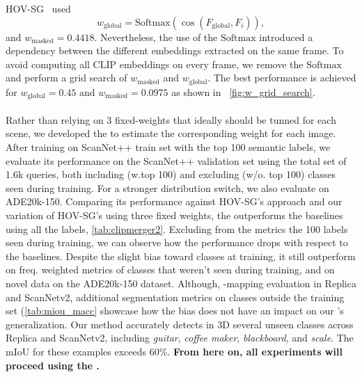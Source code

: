 HOV-SG~\cite{hovsg} used
\begin{equation}
  w_\text{global}= \mathrm{Softmax}(\cos(F_\text{global},F_{i})),
\end{equation}
%
and $w_\text{masked} = 0.4418$. 
Nevertheless, the use of the $\mathrm{Softmax}$ introduced a dependency between the different embeddings extracted on the same frame. To avoid computing all CLIP embeddings on every frame, we remove the $\mathrm{Softmax}$ and perform a grid search of \(w_\text{masked}\) and \(w_\text{global}\).
The best performance is achieved for \(w_\text{global} = 0.45 \text{ and } w_\text{masked} = 0.0975\) as shown in ~\cref{fig:w_grid_search}.
\paragraph{\clipours}
Rather than relying on 3 fixed-weights that ideally should be tunned for each scene, we developed the \clipours to estimate the corresponding weight for each image.
After training on ScanNet++ train set with the top 100 semantic labels, we evaluate its performance on the ScanNet++ validation set using the total set of 1.6k queries, both including (w.top 100) and excluding (w/o. top 100) classes seen during training. For a stronger distribution switch, we also evaluate on ADE20k-150.
\newline
Comparing its performance against HOV-SG's approach and our variation of HOV-SG's using three fixed weights, the \clipours outperforms the baselines using all the labels, \cref{tab:clipmerger2}. 
Excluding from the metrics the 100 labels seen during training, we can observe how the \clipours performance drops with respect to the baselines.
Despite the slight bias toward classes at training, it still outperform on freq. weighted metrics of classes that weren't seen during training, and on novel data on the ADE20k-150 dataset.
\newline
Although, \ours-mapping evaluation in Replica and ScanNetv2, additional segmentation metrics on classes outside the training set (\cref{tab:miou_macc} showcase how the bias does not have an impact on our \clipours's generalization.
Our method accurately detects in 3D several unseen classes across Replica and ScanNetv2, including \textit{guitar}, \textit{coffee maker}, \textit{blackboard}, and \textit{scale}. The mIoU for these examples exceeds 60\%. 
\textbf{From here on, all experiments will proceed using the \clipours.}
